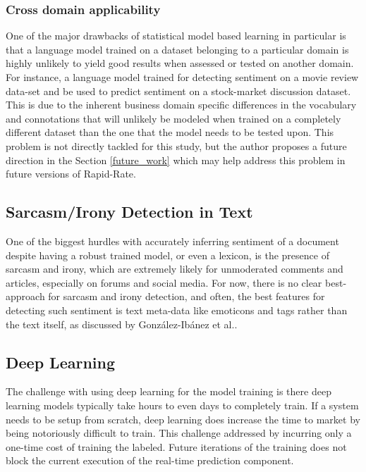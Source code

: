 \documentclass[conference]{IEEEtran}
\begin{document}
        \subsubsection{Cross domain applicability} \label{cross_domain_applicability}
            One of the major drawbacks of statistical model based learning in particular is that a language model trained on a dataset belonging to a particular domain is highly unlikely to yield good results when assessed or tested on another domain. 
            For instance, a language model trained for detecting sentiment on a movie review data-set and be used to predict sentiment on a stock-market discussion dataset. 
            This is due to the inherent business domain specific differences in the vocabulary and connotations that will unlikely be modeled when trained on a completely different dataset than the one that the model needs to be tested upon. 
            This problem is not directly tackled for this study, but the author proposes a future direction in the Section \ref{future_work} which may help address this problem in future versions of Rapid-Rate.

    \subsection{Sarcasm/Irony Detection in Text}
        One of the biggest hurdles with accurately inferring sentiment of a document despite having a robust trained model, or even a lexicon, is the presence of sarcasm and irony, which are extremely likely for unmoderated comments and articles, especially on forums and social media. 
        For now, there is no clear best-approach for sarcasm and irony detection, and often, the best features for detecting such sentiment is text meta-data like emoticons and tags rather than the text itself, as discussed by Gonz{\'a}lez-Ib{\'a}nez et al.\cite{gonzalez2011identifying}.

    \subsection{Deep Learning}
        The challenge with using deep learning for the model training is there deep learning models typically take hours to even days to completely train. 
        If a system needs to be setup from scratch, deep learning does increase the time to market by being notoriously difficult to train. 
        This challenge addressed by incurring only a one-time cost of training the labeled. Future iterations of the training does not block the current execution of the real-time prediction component.
\end{document}
